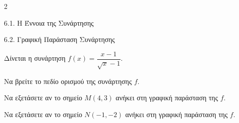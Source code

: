 \begin{ylh}{2}
    \item 6.1. Η Έννοια της Συνάρτησης
    \item 6.2. Γραφική Παράσταση Συνάρτησης
\end{ylh}
Δίνεται η συνάρτηση $f(x) = \dfrac{x - 1}{\sqrt{x} - 1}$.
\begin{alist}
\item Να βρείτε το πεδίο ορισμού της συνάρτησης $f$.
\item Να εξετάσετε αν το σημείο $M(4,3)$ ανήκει στη γραφική παράσταση της $f$.
\item Να εξετάσετε αν το σημείο $N(-1,-2)$ ανήκει στη γραφική παράσταση της $f$.
\end{alist}

